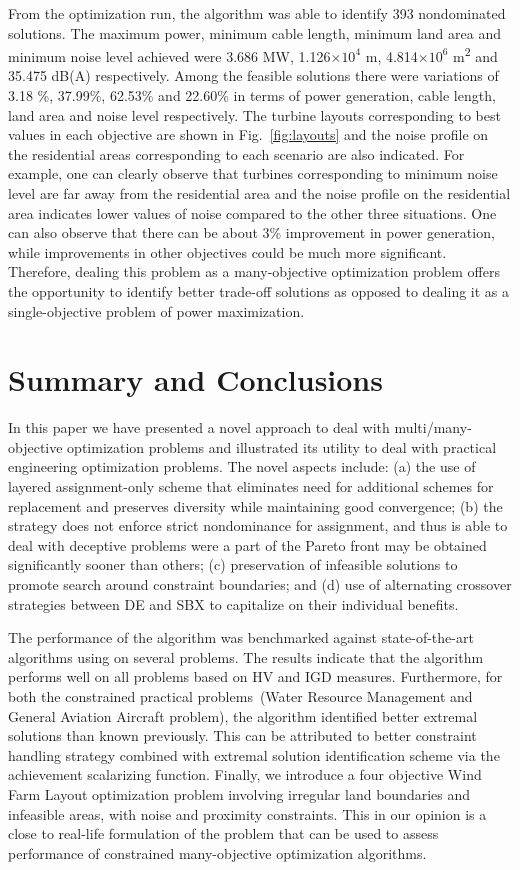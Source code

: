 From the optimization run, the algorithm was able to identify 393 nondominated solutions. The maximum power, minimum cable length, minimum land area and minimum noise level achieved were 3.686 MW, 1.126$\times 10^4$ m, 4.814$\times 10^6$ m\textsuperscript{2} and 35.475 dB(A) respectively. Among the feasible solutions there were variations of 3.18 \%, 37.99\%, 62.53\% and 22.60\% in terms of power generation, cable length, land area and noise level respectively. The turbine layouts corresponding to best values in each objective are shown in Fig.~\ref{fig:layouts} and the noise profile on the residential areas corresponding to each scenario are also indicated. For example, one can clearly observe that turbines corresponding to minimum noise level are far away from the residential area and the noise profile on the residential area indicates lower values of noise compared to the other three situations. One can also observe that there can be about 3\% improvement in power generation, while improvements in other objectives could be much more significant. Therefore, dealing this problem as a many-objective optimization problem offers the opportunity to identify better trade-off solutions as opposed to dealing it as a single-objective problem of power maximization.    

\section{Summary and Conclusions}
\label{sec:sum}

In this paper we have presented a novel approach to deal with multi/many-objective optimization problems and illustrated its utility to deal with practical engineering optimization problems. The novel aspects include: (a) the use of layered assignment-only scheme that eliminates need for additional schemes for replacement and preserves diversity while maintaining good convergence; (b) the strategy does not enforce strict nondominance for assignment, and thus is able to deal with deceptive problems were a part of the Pareto front may be obtained significantly sooner than others; (c) preservation of infeasible solutions to promote search around constraint boundaries; and (d) use of alternating crossover strategies between DE and SBX to capitalize on their individual benefits.  

The performance of the algorithm was benchmarked against state-of-the-art algorithms using on several problems. The results indicate that the algorithm performs well on all problems based on HV and IGD measures. Furthermore, for both the constrained practical problems~(Water Resource Management and General Aviation Aircraft problem), the algorithm identified better extremal solutions than known previously. This can be attributed to better constraint handling strategy combined with extremal solution identification scheme via the achievement scalarizing function. Finally, we introduce a four objective Wind Farm Layout optimization problem involving irregular land boundaries and infeasible areas, with noise and proximity constraints. This in our opinion is a close to real-life formulation of the problem that can be used to assess performance of constrained many-objective optimization algorithms.

